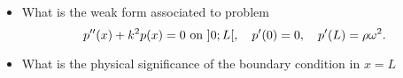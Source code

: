 \bexo



\begin{itemize}
	\item 
What is the weak form associated to problem
\begin{equation}
	p''(x)+k^2p(x)=0 \textrm{ on } ]0;L[, \quad p'(0)=0 , \quad p'(L)=\rho\omega^2. 
\end{equation}

	\item What is the physical significance of the boundary condition in $x=L$
\end{itemize}
\eexo

